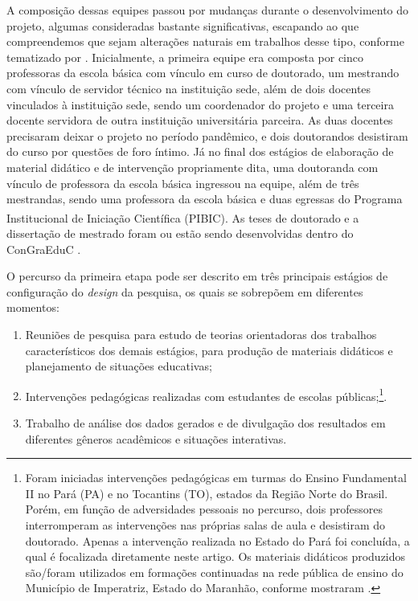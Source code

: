 A composição dessas equipes passou por mudanças durante o
desenvolvimento do projeto, algumas consideradas bastante
significativas, escapando ao que compreendemos que sejam alterações
naturais em trabalhos desse tipo, conforme tematizado por \textcite{silva_desafios_2023}. Inicialmente, a primeira equipe era composta por
cinco professoras da escola básica com vínculo em curso de doutorado, um
mestrando com vínculo de servidor técnico na instituição sede, além de
dois docentes vinculados à instituição sede, sendo um coordenador do
projeto e uma terceira docente servidora de outra instituição
universitária parceira. As duas docentes precisaram deixar o projeto no
período pandêmico, e dois doutorandos desistiram do curso por questões
de foro íntimo. Já no final dos estágios de elaboração de material
didático e de intervenção propriamente dita, uma doutoranda com vínculo
de professora da escola básica ingressou na equipe, além de três
mestrandas, sendo uma professora da escola básica e duas egressas do
Programa Institucional de Iniciação Científica (PIBIC).\textsuperscript{
}As teses de doutorado e a dissertação de mestrado foram ou estão sendo
desenvolvidas dentro do ConGraEduC \cite{antonella_recontextualizacao_2023,ribeiro_producao_2021}.



O percurso da primeira etapa pode ser descrito em três principais
estágios de configuração do \emph{design} da pesquisa, os quais se
sobrepõem em diferentes momentos: 
\begin{enumerate}
	\item Reuniões de pesquisa para estudo de teorias orientadoras dos trabalhos característicos dos demais estágios, para produção de materiais didáticos e planejamento de situações educativas;
	
	\item Intervenções pedagógicas realizadas com estudantes de escolas públicas;\footnote{Foram iniciadas intervenções pedagógicas em turmas do Ensino Fundamental II no Pará (PA) e no Tocantins (TO), estados da Região Norte do Brasil. Porém, em função de adversidades pessoais no percurso, dois professores interromperam as intervenções nas próprias salas de aula e desistiram do doutorado. Apenas a intervenção realizada no Estado do Pará foi concluída, a qual é focalizada diretamente neste artigo. Os materiais didáticos produzidos são/foram utilizados em formações continuadas na rede pública de ensino do Município de Imperatriz, Estado do Maranhão, conforme mostraram \textcite{silva_educacao_2023}.}.
	\item Trabalho de análise dos dados gerados e de divulgação dos resultados em diferentes gêneros acadêmicos e situações interativas.
\end{enumerate}

